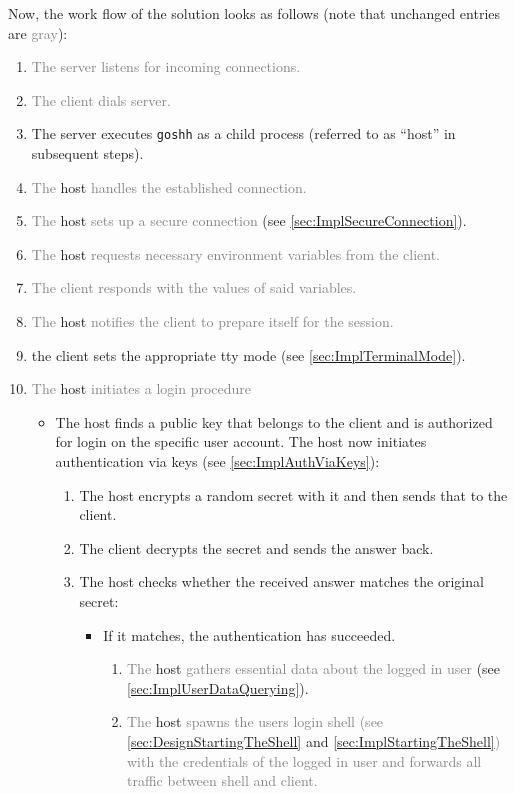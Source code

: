 \documentclass[10pt,a4paper,titlepage,twoside,english,final]{zhawreprt}
\begin{document}
Now, the work flow of the solution looks as follows (note that unchanged entries are \textcolor{gray}{gray}):
\begin{enumerate}
\item \textcolor{gray}{The server listens for incoming connections.}
\item \textcolor{gray}{The client dials server.}
\item The server executes \texttt{goshh} as a child process (referred to as ``host'' in subsequent steps).
\item \textcolor{gray}{The} host \textcolor{gray}{handles the established connection.}
\item \textcolor{gray}{The} host \textcolor{gray}{sets up a secure connection} (see \ref{sec:ImplSecureConnection}).
\item \textcolor{gray}{The} host \textcolor{gray}{requests necessary environment variables from the client.}
\item \textcolor{gray}{The client responds with the values of said variables.}
\item \textcolor{gray}{The} host \textcolor{gray}{notifies the client to prepare itself for the session.}
\item the client sets the appropriate \gls{tty} mode (see \ref{sec:ImplTerminalMode}).
\item \textcolor{gray}{The} host \textcolor{gray}{initiates a \gls{login} procedure}
\begin{itemize}
	\item The host finds a public key that belongs to the client and is authorized for \gls{login} on the specific user account.
	The host now initiates authentication via keys (see \ref{sec:ImplAuthViaKeys}):
	\begin{enumerate}
		\item The host encrypts a random secret with it and then sends that to the client.
		\item The client decrypts the secret and sends the answer back.
		\item The host checks whether the received answer matches the original secret:
		\begin{itemize}
			\item If it matches, the authentication has succeeded.
			\begin{enumerate}
				\item \textcolor{gray}{The} host \textcolor{gray}{gathers essential data about the logged in user} (see \ref{sec:ImplUserDataQuerying}).
				\item \textcolor{gray}{The} host \textcolor{gray}{spawns the users \gls{login} \gls{shell} (see \ref{sec:DesignStartingTheShell}} and \ref{sec:ImplStartingTheShell}\textcolor{gray}{) with the credentials of the logged in user and forwards all traffic between \gls{shell} and client.}

\end{enumerate}
\end{itemize}
\end{enumerate}
\end{itemize}
\end{enumerate}
\end{document}
